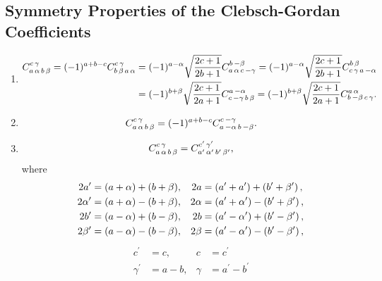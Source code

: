 \subsection{Symmetry Properties of the Clebsch-Gordan Coefficients}\label{sec:8.4.3}
\begin{enumerate}[label=(\roman*)]
\item
  \begin{align}
C_{a\,\alpha\,b\,\beta}^{c\,\gamma}=(-1)^{a+b-c} C_{b\,\beta\,a\,\alpha}^{c\,\gamma} & =(-1)^{a-\alpha} \sqrt{\frac{2 c+1}{2 b+1}} C_{a\,\alpha\,c\,-\gamma}^{b\,-\beta}=(-1)^{a-\alpha} \sqrt{\frac{2 c+1}{2 b+1}} C_{c\,\gamma\,a\,-\alpha}^{b\,\beta}  \notag\\
& =(-1)^{b+\beta} \sqrt{\frac{2 c+1}{2 a+1}} C_{c\,-\gamma\,b\,\beta}^{a\,-\alpha}=(-1)^{b+\beta} \sqrt{\frac{2 c+1}{2 a+1}} C_{b\,-\beta\,c\,\gamma}^{a\,\alpha}. \label{eq:8:4:10}
\end{align}
\item
\begin{equation}
C_{a\,\alpha\,b\,\beta}^{c\,\gamma}=(-1)^{a+b-c} C_{a\,-\alpha\,b\,-\beta}^{c\,-\gamma}. \label{eq:8:4:11}
\end{equation}
\item
\begin{equation}
C_{a\,\alpha\,b\,\beta}^{c\,\gamma}=C_{a^{\prime}\,\alpha^{\prime}\,b^{\prime}\,\beta^{\prime}}^{c^{\prime}\,\gamma^{\prime}}, \label{eq:8:4:12}
\end{equation}
where
\begin{align}
2 a^{\prime} & =(a+\alpha)+(b+\beta), & 2 a & =\left(a^{\prime}+a^{\prime}\right)+\left(b^{\prime}+\beta^{\prime}\right), \notag\\
2 \alpha^{\prime} & =(a+\alpha)-(b+\beta), & 2 \alpha & =\left(a^{\prime}+\alpha^{\prime}\right)-\left(b^{\prime}+\beta^{\prime}\right), \notag\\
2 b^{\prime} & =(a-\alpha)+(b-\beta), & 2 b & =\left(a^{\prime}-\alpha^{\prime}\right)+\left(b^{\prime}-\beta^{\prime}\right), \notag\\
2 \beta^{\prime} & =(a-\alpha)-(b-\beta), & 2 \beta & =\left(a^{\prime}-\alpha^{\prime}\right)-\left(b^{\prime}-\beta^{\prime}\right), \label{eq:8:4:13}
\end{align}
\[
\begin{aligned}
c^{\prime} & =c, & c & =c^{\prime} \\
\gamma^{\prime} & =a-b, & \gamma & =a^{\prime}-b^{\prime}

\end{aligned}\]
\end{enumerate}
